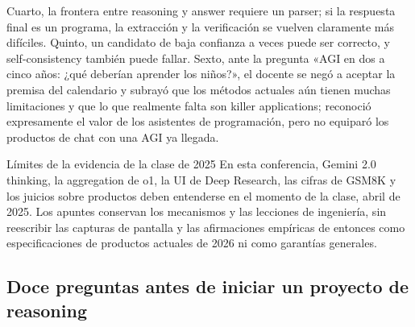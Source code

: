 \documentclass[a4paper]{article}
\begin{document}

Cuarto, la frontera entre reasoning y answer requiere un parser; si la respuesta final es un programa, la extracción y la verificación se vuelven claramente más difíciles. Quinto, un candidato de baja confianza a veces puede ser correcto, y self-consistency también puede fallar. Sexto, ante la pregunta «AGI en dos a cinco años: ¿qué deberían aprender los niños?», el docente se negó a aceptar la premisa del calendario y subrayó que los métodos actuales aún tienen muchas limitaciones y que lo que realmente falta son killer applications; reconoció expresamente el valor de los asistentes de programación, pero no equiparó los productos de chat con una AGI ya llegada.


\begin{warningbox}{Límites de la evidencia de la clase de 2025}
En esta conferencia, Gemini 2.0 thinking, la aggregation de o1, la UI de Deep Research, las cifras de GSM8K y los juicios sobre productos deben entenderse en el momento de la clase, abril de 2025. Los apuntes conservan los mecanismos y las lecciones de ingeniería, sin reescribir las capturas de pantalla y las afirmaciones empíricas de entonces como especificaciones de productos actuales de 2026 ni como garantías generales.
\end{warningbox}

\subsection{Doce preguntas antes de iniciar un proyecto de reasoning}
\end{document}
